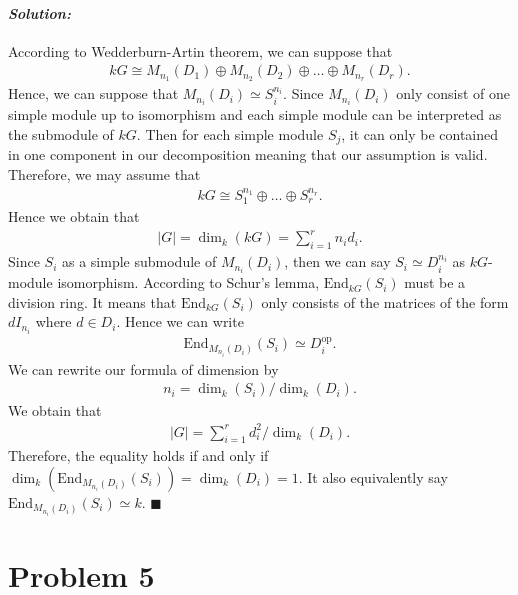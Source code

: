 \documentclass[12pt, a4paper]{article}
\theoremstyle{remark}
\newenvironment{solution}
  {\paragraph{\textit{Solution:}}\par\medskip}
  {\hfill$\blacksquare$\vspace{0.1cm}}
\begin{document}
\begin{solution}
    According to Wedderburn-Artin theorem, we can suppose that 
    \begin{align*}
        kG \cong M_{n_1}(D_1) \oplus M_{n_2}(D_2) \oplus \dots \oplus M_{n_r}(D_r).
    \end{align*}
    Hence, we can suppose that $M_{n_i}(D_i)\simeq S_i^{n_i}$. Since $M_{n_i}(D_i)$ only consist of one simple module up to isomorphism and each simple module can be interpreted as the 
    submodule of $kG$. Then for each simple module $S_j$, it can only be contained in one component in our decomposition meaning that our assumption is valid.
    Therefore, we may assume that 
    \begin{align*}
        kG \cong S_1^{n_1}\oplus \dots \oplus S_r^{n_r}.
    \end{align*}   
    Hence we obtain that 
    \begin{align*}
        |G|=\dim_k(kG) = \sum_{i=1}^r n_i d_i.
    \end{align*}
    Since $S_i$ as a simple submodule of $M_{n_i}(D_i)$, then we can say $S_i\simeq D_i^{n_i}$ as $kG$-module isomorphism.
    According to Schur's lemma, $\text{End}_{kG}(S_i)$ must be a division ring. It means that $\text{End}_{kG}(S_i)$ only
    consists of the matrices of the form $dI_{n_i}$ where $d\in D_i$. Hence we can write 
    \begin{align*}
        \text{End}_{M_{n_i}(D_i)}(S_i)\simeq D_i^{\text{op}}.
    \end{align*} 
    We can rewrite our formula of dimension by 
    \begin{align*}
        n_i=\dim_{k}(S_i)/\dim_k(D_i).
    \end{align*}
    We obtain that 
        \begin{align*}
        |G|= \sum_{i=1}^r d^2_i/\dim_k(D_i).
    \end{align*}
    Therefore, the equality holds if and only if $\dim_k(\text{End}_{M_{n_i}(D_i)}(S_i))= \dim_k(D_i)=1$.
    It also equivalently say $\text{End}_{M_{n_i}(D_i)}(S_i)\simeq k$.
\end{solution}


\section*{Problem 5}
\end{document}
